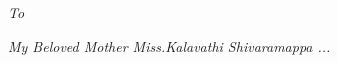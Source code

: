 \thispagestyle{empty} 
\SpecialTitle{}

\vspace{30mm}
\hspace{30mm}\textit{To}

\hspace{30mm}\textit{My Beloved Mother Miss.Kalavathi Shivaramappa ...}
